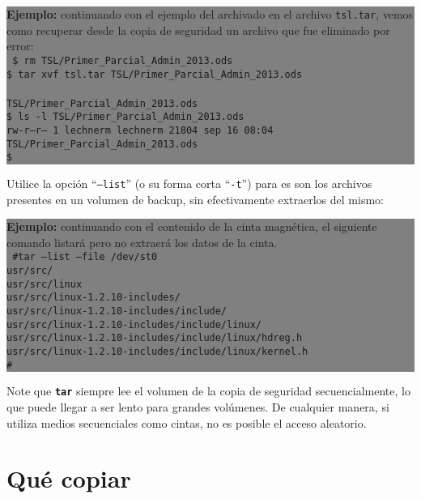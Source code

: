 \documentclass[12pt]{article}
\begin{document}
\colorbox{grey}{\parbox[t]{0.95\linewidth}{ \vspace*{0.5cm} { 
{\bf Ejemplo:} continuando con el ejemplo del archivado en el archivo 
{\tt tsl.tar}, vemos como recuperar desde la copia de seguridad un archivo
que fue eliminado por error: \\
{\tt
\$ rm TSL/Primer\_Parcial\_Admin\_2013.ods \\
\$ tar xvf tsl.tar TSL/Primer\_Parcial\_Admin\_2013.ods \\
\\TSL/Primer\_Parcial\_Admin\_2013.ods\\
\$ ls -l TSL/Primer\_Parcial\_Admin\_2013.ods\\
\-rw-r--r-- 1 lechnerm lechnerm 21804 sep 16 08:04 TSL/Primer\_Parcial\_Admin\_2013.ods\\
\$ \\
}
} \vspace*{0.5cm} } } 

Utilice la opción ``{\tt --list}'' (o su forma corta ``{\tt -t}'') para 
es son los archivos presentes en un volumen de backup, sin efectivamente 
extraerlos del mismo:

\colorbox{grey}{\parbox[t]{0.95\linewidth}{ \vspace*{0.5cm} { 
{\bf Ejemplo:} continuando con el contenido de la cinta magnética, el 
siguiente comando listará pero no extraerá los datos de la cinta.\\  
{\tt
\#tar --list --file /dev/st0\\
usr/src/\\
usr/src/linux\\
usr/src/linux-1.2.10-includes/\\
usr/src/linux-1.2.10-includes/include/\\
usr/src/linux-1.2.10-includes/include/linux/\\
usr/src/linux-1.2.10-includes/include/linux/hdreg.h\\
usr/src/linux-1.2.10-includes/include/linux/kernel.h\\
\#\\
}
} \vspace*{0.5cm} } } 

Note que \texttt{\textbf{tar}} siempre lee el volumen de la copia de 
seguridad secuencialmente, lo que puede llegar a ser lento para grandes 
volúmenes.  De cualquier manera, si utiliza medios secuenciales como 
cintas, no es posible el acceso aleatorio.
	
\section*{Qué copiar}
\end{document}
